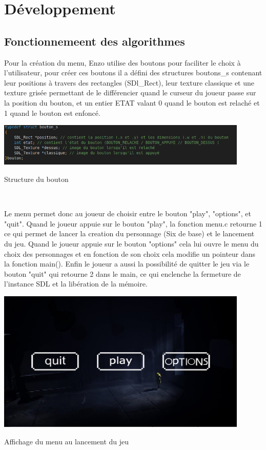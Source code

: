 \documentclass[10pt]{article}
\begin{document}
\clearpage
\section{Développement}
   \subsection{Fonctionnemeent des algorithmes}
       Pour la création du menu, Enzo utilise des boutons pour faciliter le choix à l'utilisateur, pour créer ces boutons il a défini des structures boutons\_s contenant leur positions à travers des rectangles (SDl\_Rect), leur texture classique et une texture grisée permettant de le différencier quand le curseur du joueur passe sur la position du bouton, et un entier ETAT valant 0 quand le bouton est relaché et 1 quand le bouton est enfoncé.
\\
    \begin{center}
        \centering
        \includegraphics[width=12cm]{struct_bout.png}
        \caption{Structure du bouton}
        \label{fig9}\\
    \end{center}   
    Le menu permet donc au joueur de choisir entre le bouton "play", "options", et "quit". Quand le joueur appuie sur le bouton "play", la fonction menu.c retourne 1 ce qui permet de lancer la creation du personnage (Six de base) et le lancement du jeu. Quand le joueur appuie sur le bouton "options" cela lui ouvre le menu du choix des personnages et en fonction de son choix cela modifie un pointeur dans la fonction main(). Enfin le joueur a aussi la possibilité de quitter le jeu via le bouton "quit" qui retourne 2 dans le main, ce qui enclenche la fermeture de l'instance SDL et la libération de la mémoire. 
\\
    \begin{center}
        \centering
        \includegraphics[width=12cm]{menu.png}
        \caption{Affichage du menu au lancement du jeu}
        \label{fig10}\\
    \end{center}      
\end{document}
